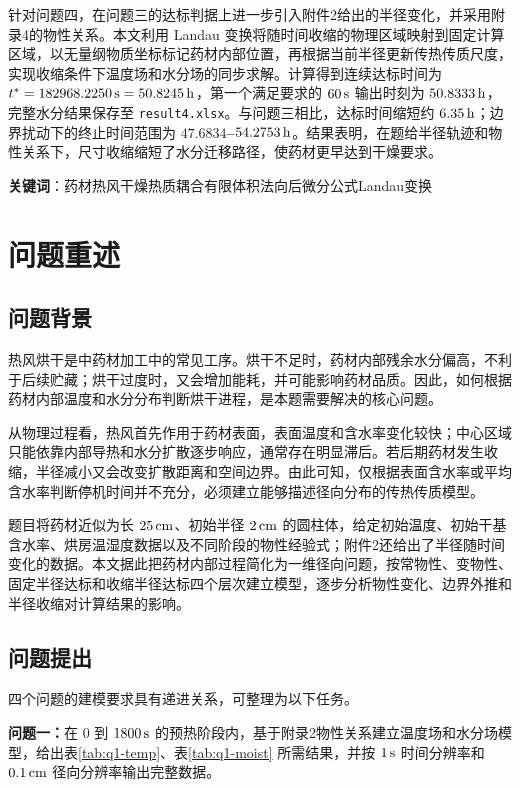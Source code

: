 \documentclass[UTF8,a4paper,12pt]{ctexart}
\begin{document}
针对问题四，在问题三的达标判据上进一步引入附件2给出的半径变化，并采用附录4的物性关系。本文利用 Landau 变换将随时间收缩的物理区域映射到固定计算区域，以无量纲物质坐标标记药材内部位置，再根据当前半径更新传热传质尺度，实现收缩条件下温度场和水分场的同步求解。计算得到连续达标时间为 \textbf{\boldmath$t^*=182968.2250\rm\,s=50.8245\rm\,h$}，第一个满足要求的 $60\rm\,s$ 输出时刻为 \textbf{\boldmath$50.8333\rm\,h$}，完整水分结果保存至 \texttt{result4.xlsx}。与问题三相比，达标时间缩短约 \textbf{\boldmath$6.35\rm\,h$}；边界扰动下的终止时间范围为 \textbf{\boldmath$47.6834$--$54.2753\rm\,h$}。结果表明，在题给半径轨迹和物性关系下，尺寸收缩缩短了水分迁移路径，使药材更早达到干燥要求。

\noindent \textbf{关键词}：药材热风干燥\quad 热质耦合\quad 有限体积法\quad 向后微分公式\quad Landau变换

\newpage
\section{问题重述}
\subsection{问题背景}
热风烘干是中药材加工中的常见工序。烘干不足时，药材内部残余水分偏高，不利于后续贮藏；烘干过度时，又会增加能耗，并可能影响药材品质。因此，如何根据药材内部温度和水分分布判断烘干进程，是本题需要解决的核心问题。

从物理过程看，热风首先作用于药材表面，表面温度和含水率变化较快；中心区域只能依靠内部导热和水分扩散逐步响应，通常存在明显滞后。若后期药材发生收缩，半径减小又会改变扩散距离和空间边界。由此可知，仅根据表面含水率或平均含水率判断停机时间并不充分，必须建立能够描述径向分布的传热传质模型。

题目将药材近似为长 $25\rm\,cm$、初始半径 $2\rm\,cm$ 的圆柱体，给定初始温度、初始干基含水率、烘房温湿度数据以及不同阶段的物性经验式；附件2还给出了半径随时间变化的数据。本文据此把药材内部过程简化为一维径向问题，按常物性、变物性、固定半径达标和收缩半径达标四个层次建立模型，逐步分析物性变化、边界外推和半径收缩对计算结果的影响。

\subsection{问题提出}
四个问题的建模要求具有递进关系，可整理为以下任务。

\textbf{问题一：}在 $0$ 到 $1800\rm\,s$ 的预热阶段内，基于附录2物性关系建立温度场和水分场模型，给出表\ref{tab:q1-temp}、表\ref{tab:q1-moist} 所需结果，并按 $1\rm\,s$ 时间分辨率和 $0.1\rm\,cm$ 径向分辨率输出完整数据。
\end{document}
